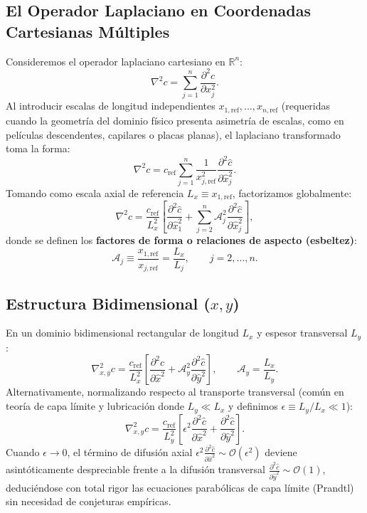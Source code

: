 \documentclass[11pt,a4paper]{article}
\begin{document}
\subsection{El Operador Laplaciano en Coordenadas Cartesianas Múltiples}
Consideremos el operador laplaciano cartesiano en $\mathbb{R}^n$:
\begin{equation}
\nabla^2 c = \sum_{j=1}^n \frac{\partial^2 c}{\partial x_j^2}.
\end{equation}
Al introducir escalas de longitud independientes $x_{1,\mathrm{ref}}, \dots, x_{n,\mathrm{ref}}$ (requeridas cuando la geometría del dominio físico presenta asimetría de escalas, como en películas descendentes, capilares o placas planas), el laplaciano transformado toma la forma:
\begin{equation}
\nabla^2 c = c_{\mathrm{ref}} \sum_{j=1}^n \frac{1}{x_{j,\mathrm{ref}}^2} \frac{\partial^2 \hat{c}}{\partial \hat{x}_j^2}.
\end{equation}
Tomando como escala axial de referencia $L_x \equiv x_{1,\mathrm{ref}}$, factorizamos globalmente:
\begin{equation}
\nabla^2 c = \frac{c_{\mathrm{ref}}}{L_x^2} \left[ \frac{\partial^2 \hat{c}}{\partial \hat{x}_1^2} + \sum_{j=2}^n \mathcal{A}_j^2 \frac{\partial^2 \hat{c}}{\partial \hat{x}_j^2} \right],
\end{equation}
donde se definen los \textbf{factores de forma o relaciones de aspecto (esbeltez)}:
\begin{equation}
\mathcal{A}_j \equiv \frac{x_{1,\mathrm{ref}}}{x_{j,\mathrm{ref}}} = \frac{L_x}{L_j}, \qquad j = 2, \dots, n.
\end{equation}

\subsection{Estructura Bidimensional ($x, y$)}
En un dominio bidimensional rectangular de longitud $L_x$ y espesor transversal $L_y$:
\begin{equation}
\nabla_{x,y}^2 c = \frac{c_{\mathrm{ref}}}{L_x^2} \left[ \frac{\partial^2 \hat{c}}{\partial \hat{x}^2} + \mathcal{A}_y^2 \frac{\partial^2 \hat{c}}{\partial \hat{y}^2} \right], \qquad \mathcal{A}_y = \frac{L_x}{L_y}.
\end{equation}
Alternativamente, normalizando respecto al transporte transversal (común en teoría de capa límite y lubricación donde $L_y \ll L_x$ y definimos $\epsilon \equiv L_y/L_x \ll 1$):
\begin{equation}
\nabla_{x,y}^2 c = \frac{c_{\mathrm{ref}}}{L_y^2} \left[ \epsilon^2 \frac{\partial^2 \hat{c}}{\partial \hat{x}^2} + \frac{\partial^2 \hat{c}}{\partial \hat{y}^2} \right].
\end{equation}
Cuando $\epsilon \to 0$, el término de difusión axial $\epsilon^2 \frac{\partial^2 \hat{c}}{\partial \hat{x}^2} \sim \mathcal{O}(\epsilon^2)$ deviene asintóticamente despreciable frente a la difusión transversal $\frac{\partial^2 \hat{c}}{\partial \hat{y}^2} \sim \mathcal{O}(1)$, deduciéndose con total rigor las ecuaciones parabólicas de capa límite (Prandtl) sin necesidad de conjeturas empíricas.
\end{document}
